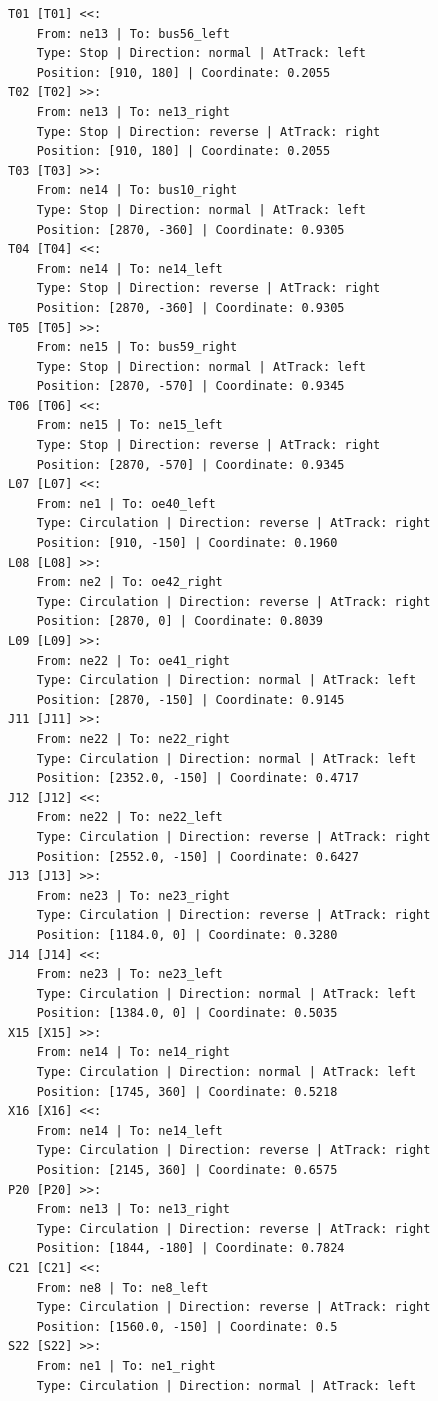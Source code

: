 	\begin{lstlisting}[language = {}, caption = Signalling.RNA, label = {lst:EJ1_6}]
T01 [T01] <<:
	From: ne13 | To: bus56_left
	Type: Stop | Direction: normal | AtTrack: left 
	Position: [910, 180] | Coordinate: 0.2055
T02 [T02] >>:
	From: ne13 | To: ne13_right
	Type: Stop | Direction: reverse | AtTrack: right 
	Position: [910, 180] | Coordinate: 0.2055
T03 [T03] >>:
	From: ne14 | To: bus10_right
	Type: Stop | Direction: normal | AtTrack: left 
	Position: [2870, -360] | Coordinate: 0.9305
T04 [T04] <<:
	From: ne14 | To: ne14_left
	Type: Stop | Direction: reverse | AtTrack: right 
	Position: [2870, -360] | Coordinate: 0.9305
T05 [T05] >>:
	From: ne15 | To: bus59_right
	Type: Stop | Direction: normal | AtTrack: left 
	Position: [2870, -570] | Coordinate: 0.9345
T06 [T06] <<:
	From: ne15 | To: ne15_left
	Type: Stop | Direction: reverse | AtTrack: right 
	Position: [2870, -570] | Coordinate: 0.9345
L07 [L07] <<:
	From: ne1 | To: oe40_left
	Type: Circulation | Direction: reverse | AtTrack: right 
	Position: [910, -150] | Coordinate: 0.1960
L08 [L08] >>:
	From: ne2 | To: oe42_right
	Type: Circulation | Direction: reverse | AtTrack: right 
	Position: [2870, 0] | Coordinate: 0.8039
L09 [L09] >>:
	From: ne22 | To: oe41_right
	Type: Circulation | Direction: normal | AtTrack: left 
	Position: [2870, -150] | Coordinate: 0.9145
J11 [J11] >>:
	From: ne22 | To: ne22_right
	Type: Circulation | Direction: normal | AtTrack: left 
	Position: [2352.0, -150] | Coordinate: 0.4717
J12 [J12] <<:
	From: ne22 | To: ne22_left
	Type: Circulation | Direction: reverse | AtTrack: right 
	Position: [2552.0, -150] | Coordinate: 0.6427
J13 [J13] >>:
	From: ne23 | To: ne23_right
	Type: Circulation | Direction: reverse | AtTrack: right 
	Position: [1184.0, 0] | Coordinate: 0.3280
J14 [J14] <<:
	From: ne23 | To: ne23_left
	Type: Circulation | Direction: normal | AtTrack: left 
	Position: [1384.0, 0] | Coordinate: 0.5035
X15 [X15] >>:
	From: ne14 | To: ne14_right
	Type: Circulation | Direction: normal | AtTrack: left 
	Position: [1745, 360] | Coordinate: 0.5218
X16 [X16] <<:
	From: ne14 | To: ne14_left
	Type: Circulation | Direction: reverse | AtTrack: right 
	Position: [2145, 360] | Coordinate: 0.6575
P20 [P20] >>:
	From: ne13 | To: ne13_right
	Type: Circulation | Direction: reverse | AtTrack: right 
	Position: [1844, -180] | Coordinate: 0.7824
C21 [C21] <<:
	From: ne8 | To: ne8_left
	Type: Circulation | Direction: reverse | AtTrack: right 
	Position: [1560.0, -150] | Coordinate: 0.5
S22 [S22] >>:
	From: ne1 | To: ne1_right
	Type: Circulation | Direction: normal | AtTrack: left 

\end{lstlisting}
